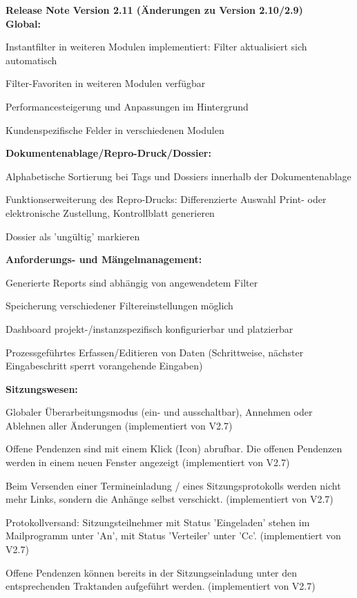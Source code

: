 \vspace{\baselineskip}
\textbf{Release Note Version 2.11 (Änderungen zu Version 2.10/2.9)} \\
\textbf{Global:}
\begin{compactitem}
	\item Instantfilter in weiteren Modulen implementiert: Filter aktualisiert sich automatisch 
	\item Filter-Favoriten in weiteren Modulen verfügbar
	\item Performancesteigerung und Anpassungen im Hintergrund
	\item Kundenspezifische Felder in verschiedenen Modulen
\end{compactitem}
\textbf{Dokumentenablage/Repro-Druck/Dossier:}
\begin{compactitem}
	\item Alphabetische Sortierung bei Tags und Dossiers innerhalb der Dokumentenablage
	\item Funktionserweiterung des Repro-Drucks: Differenzierte Auswahl Print- oder elektronische Zustellung, Kontrollblatt generieren
	\item Dossier als 'ungültig' markieren
\end{compactitem}
\textbf{Anforderungs- und Mängelmanagement:}
\begin{compactitem}
	\item Generierte Reports sind abhängig von angewendetem Filter
	\item Speicherung verschiedener Filtereinstellungen möglich
	\item Dashboard projekt-/instanzspezifisch konfigurierbar und platzierbar
	\item Prozessgeführtes Erfassen/Editieren von Daten (Schrittweise, nächster Eingabeschritt sperrt vorangehende Eingaben)
\end{compactitem}
\textbf{Sitzungswesen:}
\begin{compactitem}
	\item Globaler Überarbeitungsmodus (ein- und ausschaltbar), Annehmen oder Ablehnen aller Änderungen (implementiert von V2.7)
	\item Offene Pendenzen sind  mit einem Klick (Icon) abrufbar. Die offenen Pendenzen werden in einem neuen Fenster angezeigt (implementiert von V2.7)
	\item Beim Versenden einer Termineinladung / eines Sitzungsprotokolls werden nicht mehr Links, sondern die Anhänge selbst verschickt. (implementiert von V2.7)
	\item Protokollversand: Sitzungsteilnehmer mit Status 'Eingeladen' stehen im Mailprogramm unter 'An', mit Status 'Verteiler' unter 'Cc'. (implementiert von V2.7)
	\item Offene Pendenzen können bereits in der Sitzungseinladung unter den entsprechenden Traktanden aufgeführt werden. (implementiert von V2.7)
\end{compactitem}
